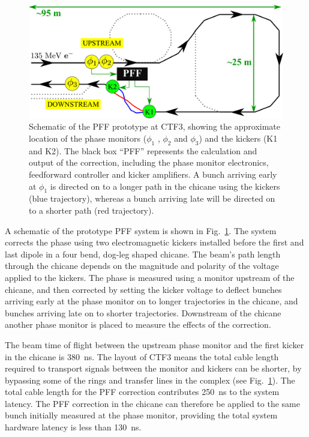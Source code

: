 \documentclass[%
 reprint,
superscriptaddress,
 amsmath,amssymb,
 prl,
]{revtex4-1}
\begin{document}
\begin{figure}
	\includegraphics[width=\columnwidth]{figs/ctfpffLayout}%
	\caption{\label{fig:pffLayout}Schematic of the PFF prototype at CTF3, 
	showing the approximate location of the phase monitors (\(\phi_1\) , 
	\(\phi_2\) and \(\phi_3\)) and
		the kickers (K1 and K2). The black box “PFF” represents the calculation 
		and output of the correction, including the phase monitor
		electronics, feedforward controller and kicker amplifiers. A bunch 
		arriving early at \(\phi_1\) is directed on to a longer path in the
		chicane
		using the kickers (blue trajectory), whereas a bunch arriving late will 
		be directed on to a shorter path (red trajectory). }
\end{figure}

A schematic of the prototype PFF system is shown in Fig.~\ref{fig:pffLayout}. 
The system corrects the phase using two electromagnetic kickers installed 
before the first and last dipole in a four bend, dog-leg shaped chicane. The 
beam's path length through the chicane depends on the magnitude and polarity of 
the voltage applied to the kickers. The phase is measured using a monitor 
upstream of the chicane, and then corrected by setting the kicker voltage to 
deflect bunches arriving early at the phase monitor on to longer trajectories 
in the chicane, and bunches arriving late on to shorter trajectories. 
Downstream of the chicane another phase monitor is placed to measure the 
effects of the correction.

The beam time of flight between the upstream phase monitor and the first kicker 
in the chicane is 380~ns. The layout of CTF3  means the total cable length 
required to transport signals between the monitor and kickers can be shorter, 
by bypassing some of the rings and transfer lines in the complex (see 
Fig.~\ref{fig:pffLayout}). The total cable length for the PFF correction 
contributes 250~ns to the system latency. The PFF correction in the chicane can 
therefore be applied to the same bunch initially measured at the phase monitor, 
providing the total system hardware latency is less than 130~ns. 
\end{document}

